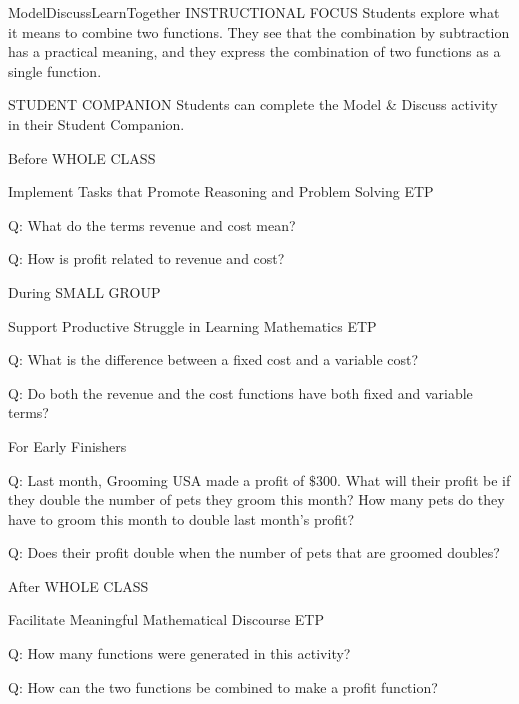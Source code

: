 \documentclass{article}
\newenvironment{te-addendum}[2]{}{}     %
\newcommand{\answer}[1]{}               %
\begin{document}
\begin{te-addendum}{ModelDiscuss}{LearnTogether}
INSTRUCTIONAL FOCUS Students explore what it means to combine two functions. They see that the combination by subtraction has a practical meaning, and they express the combination of two functions as a single function.

STUDENT COMPANION Students can complete the Model \& Discuss activity in their Student Companion.

Before WHOLE CLASS

Implement Tasks that Promote Reasoning and Problem Solving ETP

Q: What do the terms revenue and cost mean?
\answer{Revenue is income; cost is an expense of the company.}

Q: How is profit related to revenue and cost?
\answer{Profit equals revenue minus cost.}

During SMALL GROUP

Support Productive Struggle in Learning Mathematics ETP

Q: What is the difference between a fixed cost and a variable cost?
\answer{A fixed cost does not change, while a variable cost changes based on the number of items involved.}

Q: Do both the revenue and the cost functions have both fixed and variable terms?
\answer{No, the cost function has a fixed term and a variable term, but the revenue function has only a variable term.}

For Early Finishers

Q: Last month, Grooming USA made a profit of \(\$300\). What will their profit be if they double the number of pets they groom this month? How many pets do they have to groom this month to double last month's profit?
\answer{\(\$1{,}600\); 160 pets.}

Q: Does their profit double when the number of pets that are groomed doubles?
\answer{No; they only need to groom 30 more pets to double their profit. When they double the number of pets they groom, their profit is increased by more than 5 times.}

After WHOLE CLASS

Facilitate Meaningful Mathematical Discourse ETP

Q: How many functions were generated in this activity?
\answer{Two functions: one for revenue and one for cost.}

Q: How can the two functions be combined to make a profit function?
\answer{By subtracting the function for cost from the function for revenue.}
\end{te-addendum}
\end{document}
